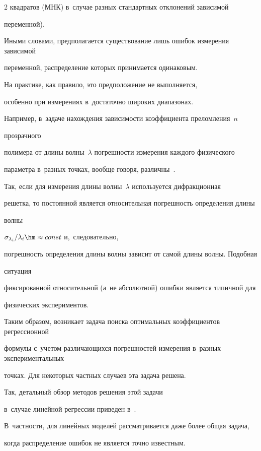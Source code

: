 \begin{multicols}{2}
квад\-ра\-тов (МНК) в~случае разных стандартных отклонений зависимой

переменной).

Иными словами, предполагается существование лишь ошибок измерения зависимой

переменной, распределение которых принимается одинаковым.



На практике, как правило, это предположение не выполняется,

особенно при измерениях в~достаточно широких диапазонах.

Например, в~задаче на\-хож\-де\-ния за\-ви\-си\-мости коэффициента преломления~$n$ 

прозрачного

полимера от длины волны~$\lambda$ по\-греш\-ности измерения каждого физического

па\-ра\-мет\-ра в~разных точках, вообще говоря, различны~\cite{Rudoy15MonteCarlo}.

Так, если для измерения длины волны~$\lambda$ используется дифракционная

решетка, то постоянной является относительная погрешность определения длины 

волны

${\sigma_{\lambda_i}}/{\lambda_i} \hm\approx {const}$ и,~следовательно,

погрешность определения длины волны зависит от самой длины волны. Подобная 

ситуация

фиксированной относительной (а~не абсолютной) ошибки является типичной для

физических экспериментов.



Таким образом, возникает задача поиска оптимальных коэффициентов регрессионной

формулы с~учетом различающихся погрешностей измерения в~разных экспериментальных 

точках. Для некоторых частных случаев эта задача решена.



Так, детальный обзор методов решения этой задачи

в~случае линейной регрессии приведен в~\cite{gillard2006historical}.

В~частности, для линейных моделей рассматривается даже более общая задача,

когда распределение ошибок не является точно известным.


\end{multicols}
